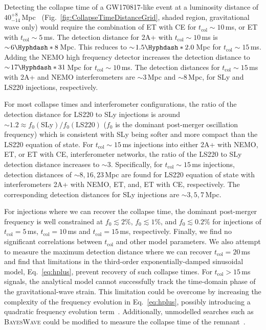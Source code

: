 \documentclass[
reprint,
prd,
twocolumn,
nofootinbib,
tightenlines %
floatfix,
 amsmath,
showpacs ,amssymb, aps,%
superscriptaddress
]{revtex4-1}
\newcommand{\tc}{t_{\mathrm{col}}}
\begin{document}
    Detecting the collapse time of a GW170817-like event at a luminosity distance of $40^{+8}_{-14}$\,Mpc~\cite{GW170817multi} (Fig.~\ref{fig:CollapseTimeDistanceGrid}, shaded region, gravitational wave only) would require the combination of ET with CE for $\tc \sim\!10$\,ms,  or ET with $\tc \sim\!5$\,ms. 
    The detection distance for 2A+ with  $\tc\sim\!10$\,ms is $\sim\!6\Hyphdash*8$\,Mpc.  
    This reduces to $\sim\!1.5\Hyphdash*2.0$\,Mpc for $\tc \sim\!15$\,ms. 
    Adding the NEMO high frequency detector increases the detection distance to $\sim\!17\Hyphdash*31$\,Mpc  for $\tc \sim\!10$\,ms.
    The detection distances for $\tc\sim\!15$\,ms with 2A+ and NEMO interferometers are $\sim\!3$\,Mpc and $\sim\!8$\,Mpc, for SLy and LS220 injections, respectively.\par
    
    
    For most collapse times and interferometer configurations, the ratio of the detection distance for LS220 to SLy injections is around $\sim\!1.2\approx f_0(\mathrm{SLy}) / f_0(\mathrm{LS220})$ ($f_0$ is the dominant post-merger oscillation frequency) which is consistent with SLy being softer and more compact than the LS220 equation of state. 
    For $\tc\!\sim15$\,ms injections into either 2A+ with NEMO, ET, or ET with CE, interferometer networks, the ratio of the LS220 to SLy detection distance increases to $\sim\!3$.
    Specifically, for $\tc\!\sim15$\,ms injections, detection distances of $\sim\!8,16,23$\,Mpc are found for LS220 equation of state with interferometers 2A+ with NEMO, ET, and, ET with CE, respectively.
    The corresponding detection distances for SLy injections are $\sim\!3,5,7$\,Mpc. 
    \par
    For injections where we can recover the collapse time, the dominant post-merger frequency is well constrained at $f_0 \lesssim 2\%$, $f_0 \lesssim 1\%$, and $f_0 \lesssim 0.2\%$ for injections of $\tc=5$\,ms, $\tc=10$\,ms and $\tc=15$\,ms, respectively. 
    Finally, we find no significant correlations between $\tc$ and other model parameters.
    We also attempt to measure the maximum detection distance where we can recover $\tc=20$\,ms and find that limitations in the third-order exponentially-damped sinusoidal model, Eq.~\ref{eq:hplus}, prevent recovery of such collapse times.
    For $\tc > 15$\,ms signals, the analytical model cannot successfully track the time-domain phase of the gravitational-wave strain.
    This limitation could be overcome by increasing the complexity of the frequency evolution in Eq.~\ref{eq:hplus}, possibly introducing a quadratic frequency evolution term~\cite{Bose2018}.
    Additionally, unmodelled searches such as \textsc{BayesWave} could be modified to measure the collapse time of the remnant~\cite{Cornish2015,Littenberg2015,Chatziioannou2017,Torres-Rivas2019}.\par
\vspace{-0.25cm}
\end{document}
